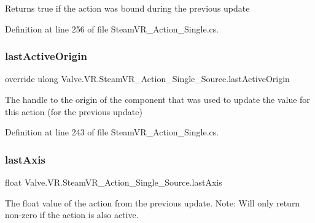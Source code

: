 Returns true if the action was bound during the previous update 



Definition at line 256 of file Steam\+V\+R\+\_\+\+Action\+\_\+\+Single.\+cs.

\mbox{\label{class_valve_1_1_v_r_1_1_steam_v_r___action___single___source_aefb428810828fd6044907d78cf44007e}} 
\subsubsection{\texorpdfstring{lastActiveOrigin}{lastActiveOrigin}}
{\footnotesize\ttfamily override ulong Valve.\+V\+R.\+Steam\+V\+R\+\_\+\+Action\+\_\+\+Single\+\_\+\+Source.\+last\+Active\+Origin\hspace{0.3cm}{\ttfamily [get]}}



The handle to the origin of the component that was used to update the value for this action (for the previous update) 



Definition at line 243 of file Steam\+V\+R\+\_\+\+Action\+\_\+\+Single.\+cs.

\mbox{\label{class_valve_1_1_v_r_1_1_steam_v_r___action___single___source_a8bf67221f2e4d862277131972d0ecd69}} 
\subsubsection{\texorpdfstring{lastAxis}{lastAxis}}
{\footnotesize\ttfamily float Valve.\+V\+R.\+Steam\+V\+R\+\_\+\+Action\+\_\+\+Single\+\_\+\+Source.\+last\+Axis\hspace{0.3cm}{\ttfamily [get]}}



The float value of the action from the previous update. Note\+: Will only return non-\/zero if the action is also active. 



